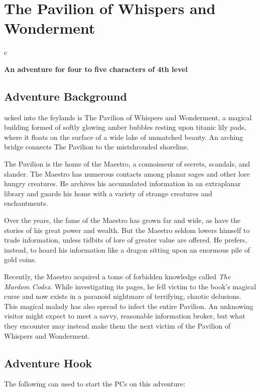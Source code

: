 \documentclass[10pt,a4paper,twoside,bg=print,twocolumn,openany,nodeprecatedcode]{dndbook}
\begin{document}
\chapter{The Pavilion of Whispers and Wonderment}

\begin{DndTable}{c}

\textbf{An adventure for four to five characters of 4th level}\\
\end{DndTable}

\section{Adventure Background}
ucked into the feylands is The Pavilion of Whispers and Wonderment, a magical building formed of softly glowing amber bubbles resting upon titanic lily pads, where it floats on the surface of a wide lake of unmatched beauty. An arching bridge connects The Pavilion to the mistshrouded shoreline.


The Pavilion is the home of the Maestro, a connoisseur of secrets, scandals, and slander. The Maestro has numerous contacts among planar sages and other lore hungry creatures. He archives his accumulated information in an extraplanar library and guards his home with a variety of strange creatures and enchantments.

Over the years, the fame of the Maestro has grown far and wide, as have the stories of his great power and wealth. But the Maestro seldom lowers himself to trade information, unless tidbits of lore of greater value are offered. He prefers, instead, to hoard his information like a dragon sitting upon an enormous pile of gold coins.

Recently, the Maestro acquired a tome of forbidden knowledge called \textit{The Mardom Codex}. While investigating its pages, he fell victim to the book's magical curse and now exists in a paranoid nightmare of terrifying, chaotic delusions. This magical malady has also spread to infect the entire Pavilion. An unknowing visitor might expect to meet a savvy, reasonable information broker, but what they encounter may instead make them the next victim of the Pavilion of Whispers and Wonderment.

\section{Adventure Hook}
The following can used to start the PCs on this adventure:
\end{document}
